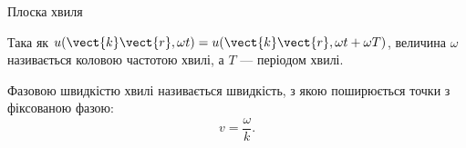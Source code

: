 \documentclass[onlytextwidth]{beamer}
\begin{document}
\begin{frame}{Плоска хвиля}
\begin{overprint}
		\begin{block}{}\justifying
			Така як $u(\vect{k}\vect{r}, \omega t) =  u(\vect{k}\vect{r}, \omega t + \omega T)$, величина $\omega$ називається коловою \alert{частотою
				хвилі}, а $T$ --- \alert{періодом хвилі}.
		\end{block}
		\begin{block}{}\justifying
			\alert{Фазовою швидкістю хвилі} називається швидкість, з якою поширюється точки з фіксованою фазою:
			\begin{equation*}
				v = \frac{\omega}{k}.
			\end{equation*}
		\end{block}
	\end{overprint}
\end{frame}
\end{document}
